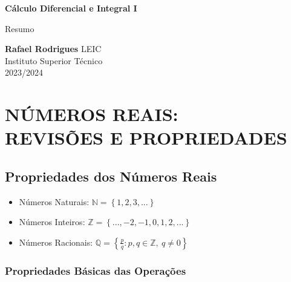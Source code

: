 \documentclass[11pt]{article}
\begin{document}
\begin{titlepage}
    \begin{center}
        \vspace*{1cm}

        \textbf{\LARGE Cálculo Diferencial e Integral I}
        \vspace{0.5cm}

        \Large Resumo
        \vspace{1.5cm}

        \textbf{Rafael Rodrigues}
        \vfill
        LEIC \\
        Instituto Superior Técnico \\
        2023/2024
    \end{center}
\end{titlepage}

\tableofcontents

\newpage

\section{\MakeUppercase{Números Reais: \\ Revisões e Propriedades}}

\subsection{Propriedades dos Números Reais}

\begin{itemize}[topsep=0pt]
    \item Números Naturais: $\mathbb{N} = \left\{1, 2, 3, ...\right\}$
    \item Números Inteiros: $\mathbb{Z} = \left\{..., -2, -1, 0, 1, 2, ...\right\}$
    \item Números Racionais: $\mathbb{Q} = \displaystyle \left\{\frac{p}{q}:p,q\in \mathbb{Z},\ q \neq 0\right\}$
\end{itemize}

\subsubsection{Propriedades Básicas das Operações}
\end{document}
